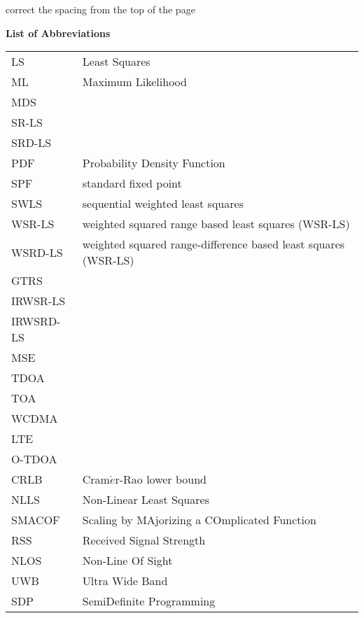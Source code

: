 \newpage
{}

\phantom{m}

correct the spacing from the top of the page

\begin{flushleft}
\begin{Huge}
\textbf{List of Abbreviations}
\end{Huge}
\end{flushleft}

\begin{table}[h]
\begin{tabular}{l l} 
LS & Least Squares \\
ML & Maximum Likelihood \\
MDS &  \\
SR-LS  & \\
SRD-LS & \\
PDF & Probability Density Function \\
SPF & standard fixed point\\
SWLS & sequential weighted least squares \\
WSR-LS & weighted squared range based least squares (WSR-LS)\\
WSRD-LS & weighted squared range-difference based least squares (WSR-LS)\\
GTRS & \\
IRWSR-LS & \\
IRWSRD-LS & \\
MSE & \\
TDOA & \\
TOA & \\
WCDMA & \\
LTE & \\
O-TDOA & \\
CRLB & Cram$\acute{e}$r-Rao  lower  bound \\
NLLS & Non-Linear Least Squares \\
SMACOF & Scaling by MAjorizing a COmplicated Function \\
RSS & Received Signal Strength \\
NLOS & Non-Line Of Sight \\
UWB & Ultra Wide Band \\
SDP & SemiDefinite Programming \\
\end{tabular}
\end{table}
